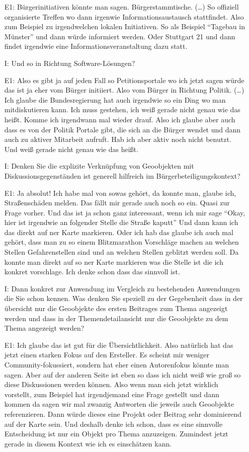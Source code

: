 \begin{itemize}
    \item[E1:] B{\"u}rgerinitiativen k{\"o}nnte man sagen. B{\"u}rgerstammtische. (\dots) So offiziell organisierte Treffen wo dann irgenwie Informationsaustausch stattfindet. Also zum Beispiel zu irgendwelchen lokalen Initiativen. So als Beispiel "`Tagebau in M{\"u}nster"' und dann w{\"u}rde informiert werden. Oder Stuttgart 21 und dann findet irgendwie eine Informationsveranstaltung dazu statt. 
    \item[I:] Und so in Richtung Software-L{\"o}sungen?
    \item[E1:] Also es gibt ja auf jeden Fall so Petitionsportale wo ich jetzt sagen w{\"u}rde das ist ja eher vom B{\"u}rger initiiert. Also vom B{\"u}rger in Richtung Politik. (\dots) Ich glaube die Bundesregierung hat auch irgendwie so ein Ding wo man mitdiskutieren kann. Ich muss gestehen, ich wei{\ss} gerade nicht genau wie das hei{\ss}t. Komme ich irgendwann mal wieder drauf. Also ich glaube aber auch dass es von der Politik Portale gibt, die sich an die B{\"u}rger wendet und dann auch zu aktiver Mitarbeit aufruft. Hab ich aber aktiv noch nicht benutzt. Und wei{\ss} gerade nicht genau wie das hei{\ss}t. 
    \item[I:] Denken Sie die explizite Verkn{\"u}pfung von Geoobjekten mit Diskussionsgegenst{\"a}nden ist generell hilfreich im B{\"u}rgerbeteiligungskontext?
    \item[E1:] Ja absolut! Ich habe mal von sowas geh{\"o}rt, da konnte man, glaube ich, Stra{\ss}ensch{\"a}den melden. Das f{\"a}llt mir gerade auch noch so ein. Quasi zur Frage vorher. Und das ist ja schon ganz interessant, wenn ich mir sage "`Okay, hier ist irgendwie an folgender Stelle die Stra{\ss}e kaputt"' Und dann kann ich das direkt auf ner Karte markieren. Oder ich hab das glaube ich auch mal geh{\"o}rt, dass man zu so einem Blitzmarathon Vorschl{\"a}ge machen an welchen Stellen Gefahrenstellen sind und an welchen Stellen geblitzt werden soll. Da konnte man direkt auf so ner Karte markieren was die Stelle ist die ich konkret vorschlage. Ich denke schon dass das sinnvoll ist. 
    \item[I:] Dann konkret zur Anwendung im Vergleich zu bestehenden Anwendungen die Sie schon kennen. Was denken Sie speziell zu der Gegebenheit dass in der {\"u}bersicht nur die Geoobjekte des ersten Beitrages zum Thema angezeigt werden und dass in der Themendetailansicht nur die Geoobjekte zu dem Thema angezeigt werden?
    \item[E1:] Ich glaube das ist gut f{\"u}r die {\"U}bersichtlichkeit. Also nat{\"u}rlich hat das jetzt einen starken Fokus auf den Ersteller. Es scheint mir weniger Community-fokussiert, sondern hat eher einen Autorenfokus k{\"o}nnte man sagen. Aber auf der anderen Seite ist eben so dass ich nicht wei{\ss} wie gro{\ss} so diese Diskussionen werden k{\"o}nnen. Also wenn man sich jetzt wirklich vorstellt, zum Beispiel hat irgendjemand eine Frage gestellt und dann kommen da sagen wir mal zwanzig Antworten die jeweils auch Geoobjekte referenzieren. Dann w{\"u}rde dieses eine Projekt oder Beitrag sehr dominierend auf der Karte sein. Und deshalb denke ich schon, dass es eine sinnvolle Entscheidung ist nur ein Objekt pro Thema anzuzeigen. Zumindest jetzt gerade in diesem Kontext wie ich es einsch{\"a}tzen kann.

\end{itemize}
